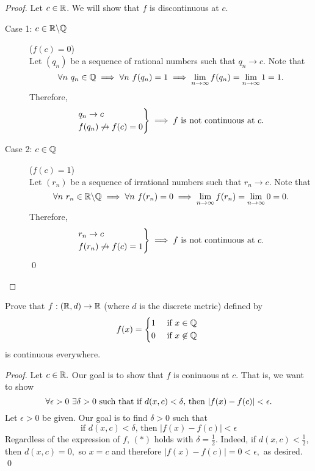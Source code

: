 \begin{proof}
    Let $c\in \mathbb{R}$. We will show that $f$ is discontinuous at $c$.
    \begin{description}
        \item[Case 1: $c \in \mathbb{R} \backslash \mathbb{Q}$] ($f(c) = 0$) \leavevmode \\
        Let $(q_n)$ be a sequence of rational numbers such that $q_n \to c.$ Note that
        $$\forall n ~q_n \in \mathbb{Q} \implies \forall n ~f(q_n) = 1 \implies \lim \limits_{n \to \infty}f(q_n) = \lim \limits_{n\to \infty}1 = 1.$$ 
        Therefore,
        $$
        \begin{rcases*}
            q_n \to c \\
            f(q_n) \not \to f(c) = 0
        \end{rcases*} \implies f \text{ is not continuous at $c$}.
        $$
        \item[Case 2: $c \in \mathbb{Q}$] ($f(c) = 1$)\leavevmode \\
        Let $(r_n)$ be a sequence of irrational numbers such that $r_n \to c.$ Note that
        $$\forall n ~r_n \in \mathbb{R} \backslash \mathbb{Q} \implies \forall n ~f(r_n) = 0 \implies \lim \limits_{n\to \infty}f(r_n) = \lim \limits_{n \to \infty}0 = 0.$$
        Therefore,
        $$
        \begin{rcases*}
            r_n \to c \\
            f(r_n) \not \to f(c) = 1
        \end{rcases*} \implies f \text{ is not continuous at $c$}.
        $$
        \qed
    \end{description}
\end{proof}

\begin{example}
    Prove that $f: (\mathbb{R}, d) \to \mathbb{R}$ (where $d$ is the discrete metric) defined by
    $$
    f(x) = \begin{cases*}
        1 &\text{ if $x\in \Q$} \\
        0 &\text{ if $x \not \in \Q$}
    \end{cases*}
    $$
    is continuous everywhere.
\end{example}

\begin{proof}
    Let $c\in \mathbb{R}.$ Our goal is to show that $f$ is coninuous at $c.$ That is, we want to show
    $$\forall \epsilon > 0 ~\exists \delta > 0 \text{ such that } \text{if $d(x,c) < \delta$, then $|f(x) - f(c)| < \epsilon.$}$$
    Let $\epsilon > 0$ be given. Our goal is to find $\delta > 0$ such that 
    \begin{equation*}
        \text{if $d(x,c) < \delta$, then $|f(x) - f(c)| < \epsilon$}
        \tag{$*$}
    \end{equation*}
    Regardless of the expression of $f$, $(*)$ holds with $\delta = \frac{1}{2}$. Indeed, if $d(x,c) < \frac{1}{2}$, then $d(x,c) = 0,$ so $x=c$ and therefore $|f(x) - f(c)| = 0 < \epsilon,$ as desired. \qed
\end{proof}

